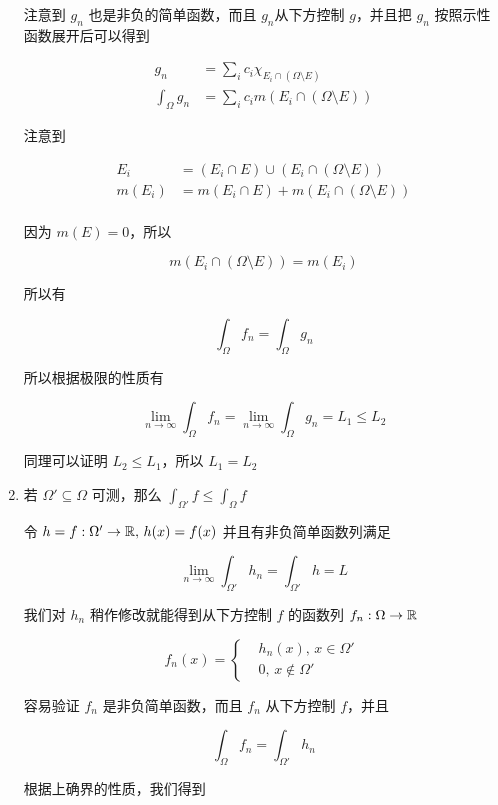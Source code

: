 \begin{enumerate}
    注意到 $g_n$ 也是非负的简单函数，而且 $g_n$从下方控制 $g$，并且把 $g_n$ 按照示性函数展开后可以得到

    \begin{align*}
        g_n &= \sum_{i}c_i \chi_{E_i \cap (\Omega \setminus E)} \\
        \int_{\Omega} g_n &= \sum_{i}c_i m(E_i \cap (\Omega \setminus E))
    \end{align*}

    注意到

    \begin{align*}
        E_i &= (E_i \cap E) \cup (E_i \cap (\Omega \setminus E)) \\
        m(E_i) &= m(E_i \cap E) + m(E_i \cap (\Omega \setminus E)) \\
    \end{align*}

    因为 $m(E) = 0$，所以

    \[
        m(E_i \cap (\Omega \setminus E)) = m(E_i)
    \]

    所以有

    \[
        \int_{\Omega} f_n = \int_{\Omega} g_n
    \]

    所以根据极限的性质有

    \[
        \lim_{n \to \infty}\int_{\Omega} f_n = \lim_{n \to \infty}\int_{\Omega} g_n = L_1 \le L_2
    \]

    同理可以证明 $L_2 \le L_1$，所以 $L_1 = L_2$

    \item 若 $\Omega' \subseteq \Omega$ 可测，那么 $\int_{\Omega'}f \le \int_{\Omega} f$

    令 $h = f: \Omega' \to \mathbb{R},\, h(x) = f(x)$ 并且有非负简单函数列满足

    \[
       \lim_{n \to \infty}\int_{\Omega'}h_n = \int_{\Omega'}h = L
    \]

    我们对 $h_n$ 稍作修改就能得到从下方控制 $f$ 的函数列 $f_n: \Omega \to \mathbb{R}$

    \[
        f_n(x) = \begin{cases}
           & h_n(x),\, x \in \Omega' \\
           & 0,\, x \notin \Omega'
        \end{cases}\
    \]

    容易验证 $f_n $ 是非负简单函数，而且 $f_n$ 从下方控制 $f$，并且

    \[
        \int_{\Omega} f_n = \int_{\Omega'}h_n
    \]

    根据上确界的性质，我们得到


\end{enumerate}
